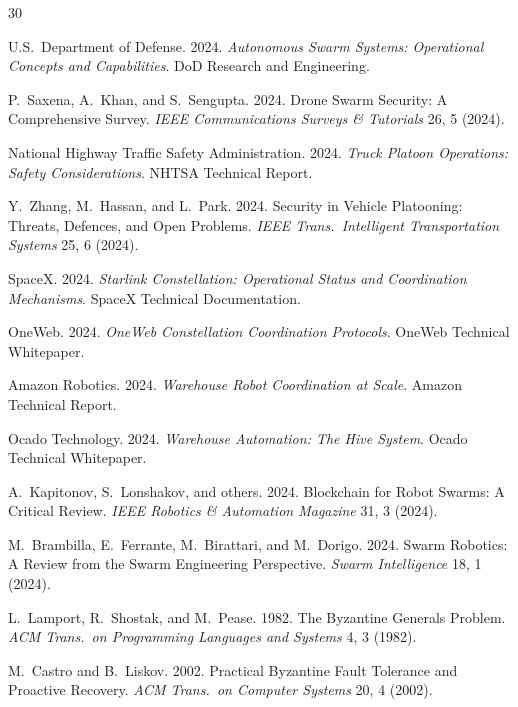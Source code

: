 \documentclass[sigconf,nonacm]{acmart}
\begin{document}
\sloppy

\begin{thebibliography}{30}

U.S.~Department of Defense. 2024. \textit{Autonomous Swarm
Systems: Operational Concepts and Capabilities}. DoD Research
and Engineering.

P.~Saxena, A.~Khan, and S.~Sengupta. 2024. Drone Swarm Security:
A Comprehensive Survey. \textit{IEEE Communications Surveys \&
Tutorials} 26, 5 (2024).

National Highway Traffic Safety Administration. 2024.
\textit{Truck Platoon Operations: Safety Considerations}. NHTSA
Technical Report.

Y.~Zhang, M.~Hassan, and L.~Park. 2024. Security in Vehicle
Platooning: Threats, Defences, and Open Problems.
\textit{IEEE Trans.\ Intelligent Transportation Systems}
25, 6 (2024).

SpaceX. 2024. \textit{Starlink Constellation: Operational Status
and Coordination Mechanisms}. SpaceX Technical Documentation.

OneWeb. 2024. \textit{OneWeb Constellation Coordination
Protocols}. OneWeb Technical Whitepaper.

Amazon Robotics. 2024. \textit{Warehouse Robot Coordination at
Scale}. Amazon Technical Report.

Ocado Technology. 2024. \textit{Warehouse Automation: The Hive
System}. Ocado Technical Whitepaper.

A.~Kapitonov, S.~Lonshakov, and others. 2024. Blockchain for
Robot Swarms: A Critical Review.
\textit{IEEE Robotics \& Automation Magazine} 31, 3 (2024).

M.~Brambilla, E.~Ferrante, M.~Birattari, and M.~Dorigo. 2024.
Swarm Robotics: A Review from the Swarm Engineering Perspective.
\textit{Swarm Intelligence} 18, 1 (2024).

L.~Lamport, R.~Shostak, and M.~Pease. 1982. The Byzantine
Generals Problem.
\textit{ACM Trans.\ on Programming Languages and Systems} 4, 3
(1982).

M.~Castro and B.~Liskov. 2002. Practical Byzantine Fault
Tolerance and Proactive Recovery.
\textit{ACM Trans.\ on Computer Systems} 20, 4 (2002).


\end{thebibliography}
\end{document}

